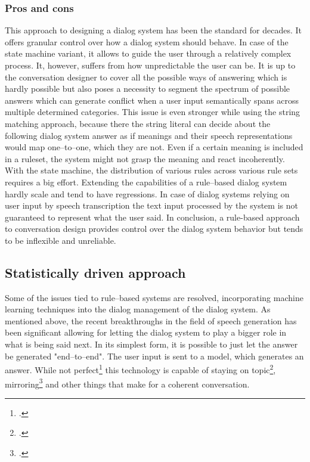 \documentclass[12pt]{report}
\begin{document}
{\subsubsection{Pros and cons}

\par
This approach to designing a dialog system
has been the standard for decades.
It offers granular control over how a dialog system should behave.
In case of the state machine variant, it
allows to guide the user through a relatively complex process.
It, however, suffers from how unpredictable the user can be.
It is up to the conversation designer to cover all the possible ways of answering
which is hardly possible
but also poses a necessity to segment the spectrum of possible answers
which can generate conflict when
a user input semantically spans across multiple determined categories.
This issue is even stronger while using the string matching approach,
because there the string literal can decide about the following dialog system answer
as if meanings and their speech representations would map one–to–one,
which they are not.
Even if a certain meaning is included in a ruleset,
the system might not grasp the meaning and react incoherently.
With the state machine, the
distribution of various rules across various rule sets
requires a big effort.
Extending the capabilities of a rule–based dialog system
hardly scale and tend to have regressions.
In case of dialog systems relying on user input by speech transcription
the text input processed by the system is not guaranteed to represent
what the user said.
In conclusion,  a rule-based approach to conversation design
provides control over the dialog system behavior
but tends to be inflexible and unreliable.

\subsection{Statistically driven approach}

Some of the issues tied to rule–based systems
are resolved, incorporating machine learning techniques into the dialog management of the dialog system.
As mentioned above, the recent breakthroughs in the field
of speech generation has been significant
allowing for letting the dialog system to play a bigger role
in what is being said next.
In its simplest form,
it is possible to just let the answer be generated "end–to–end".
The user input is sent to a model, which generates an answer.
While not perfect\footcite{tie2024llms}
this technology is capable of staying on topic\footcite{sreedhar2024canttalkaboutthisaligninglanguagemodels},
mirroring\footcite{ivey2024real}
and other things that make for a coherent conversation.

}
\end{document}
